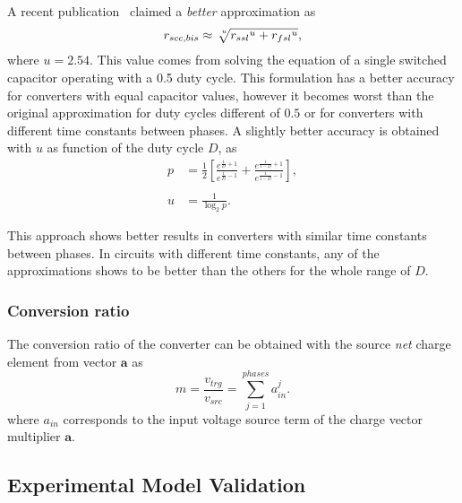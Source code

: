 A recent publication~\cite{2012Makowski} claimed a \emph{better} approximation as
\begin{equation}
r_{scc,bis} \approx \sqrt[\leftroot{-3}\uproot{3} u]{{r_{ssl}}^{u}+{r_{fsl}}^{u}},
\label{eq:r_scc_II}
\end{equation}
where $u = 2.54$. This value comes from solving the equation of a single switched capacitor operating with a 0.5 duty cycle. This formulation has a better accuracy for converters with equal capacitor values, however it becomes worst than the original approximation for duty cycles different of $0.5$ or for converters with different time constants between phases. A slightly better accuracy is obtained with $u$ as function of the duty cycle $D$, as
\begin{align}
p & = \frac{1}{2} \left[ \frac{e^{\frac{1}{D}+1}}{e^{\frac{1}{D}-1}} + \frac{e^{\frac{1}{1-D}+1}}{e^{\frac{1}{1-D}-1}} \right],
\\
\\
u &= \frac{1}{\log_2 p}.
\label{eq:u_factor}
\end{align}

This approach shows better results in converters with similar time constants between phases. In circuits with different time constants, any of the approximations shows to be better than the others for the whole range of $D$.

\subsubsection{Conversion ratio}

The conversion ratio of the converter can be obtained with the source \emph{net} charge element from vector $\mathbf{a}$ as
\begin{equation}
m=\frac{{v_{trg}}}{v_{src}}=\sum_{j=1}^{phases}a_{in}^j.
\label{eq:r_ssl}
\end{equation}
where $a_{in}$  corresponds to the input voltage source term of the charge vector multiplier $\mathbf{a}$.

\subsection{Experimental Model Validation}

